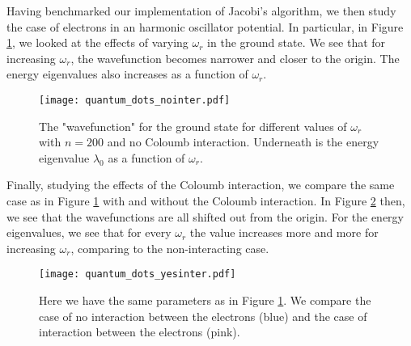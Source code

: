 Having benchmarked our implementation of Jacobi's algorithm, we then study the case
of electrons in an harmonic oscillator potential. In particular, in Figure
\ref{fig:quantum_dots_nointer}, we looked at the effects of varying $\omega_r$ in the
ground state. We see that for increasing $\omega_r$, the wavefunction becomes
narrower and closer to the origin. The energy eigenvalues also increases as a function of $\omega_r$.
\begin{figure}[htbp]
	\centering
	\texttt{[image: quantum\_dots\_nointer.pdf]}
	\caption{The "wavefunction" for the ground state for different values of $\omega_r$ with $n=200$ and no Coloumb interaction.
	Underneath is the energy eigenvalue $\lambda_0$ as a function of $\omega_r$.}
	\label{fig:quantum_dots_nointer}
\end{figure}


Finally, studying the effects of the Coloumb interaction, we compare the same case
as in Figure \ref{fig:quantum_dots_nointer} with and without the Coloumb interaction.
In Figure \ref{fig:quantum_dots_yesinter} then, we see that the wavefunctions are
all shifted out from the origin. For the energy eigenvalues,
we see that for every $\omega_r$ the value increases more and more for increasing $\omega_r$, comparing to the non-interacting case.
\begin{figure}[htbp]
	\centering
	\texttt{[image: quantum\_dots\_yesinter.pdf]}
	\caption{Here we have the same parameters as in Figure \ref{fig:quantum_dots_nointer}.
	We compare the case of no interaction between the electrons (blue) and the case of
	interaction between the electrons (pink).}
	\label{fig:quantum_dots_yesinter}
\end{figure}
